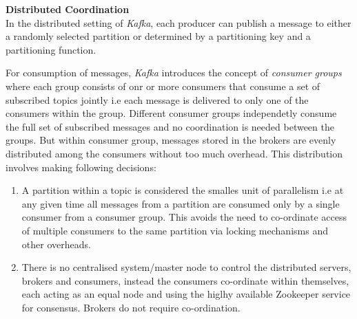 \documentclass[12pt, a4paper]{article}
\begin{document}
\textbf{Distributed Coordination}\\
In the distributed setting of \textit{Kafka}, each producer can publish a message to either a randomly selected partition or determined by a partitioning key and a partitioning function.\par

For consumption of messages, \textit{Kafka} introduces the concept of \textit{consumer groups} where each group consists of onr or more consumers that consume a set of subscribed topics jointly i.e each message is delivered to only one of the consumers within the group. Different consumer groups independetly consume the full set of subscribed messages and no coordination is needed between the groups. But within consumer group, messages stored in the brokers are evenly distributed among the consumers without too much overhead. This distribution involves making following decisions:

\begin{enumerate}
    \item A partition within a topic is considered the smalles unit of parallelism i.e at any given time all messages from a partition are consumed only by a single consumer from a consumer group. This avoids the need to co-ordinate access of multiple consumers to the same partition via locking mechanisms and other overheads.

    \item There is no centralised system/master node to control the distributed servers, brokers and consumers, instead the consumers co-ordinate within themselves, each acting as an equal node and using the higlhy available Zookeeper service for consensus. Brokers do not require co-ordination.
\end{enumerate}
\end{document}
